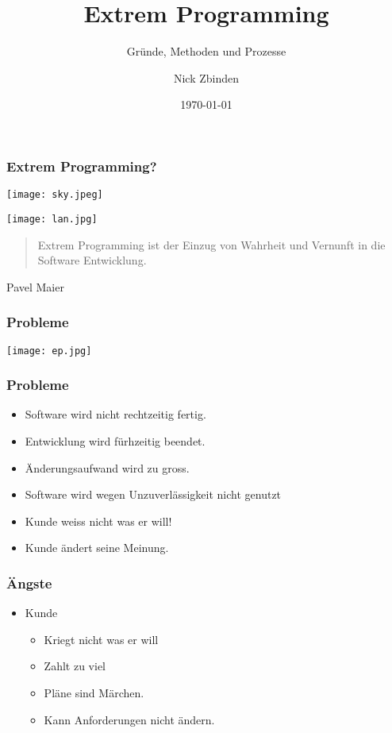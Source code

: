 \documentclass[compress, blue]{beamer}
\title{Extrem Programming}
\subtitle{Gründe, Methoden und Prozesse}
\author{Nick Zbinden}
\date{\today}
\begin{document}
\begin{frame}
  \titlepage
\end{frame}

\begin{frame}\frametitle{Extrem Programming?}
  \texttt{[image: sky.jpeg]}
\end{frame}

\begin{frame}
  \texttt{[image: lan.jpg]}
\end{frame}

\begin{frame}
  \begin{quote}
    Extrem Programming ist der Einzug von Wahrheit und Vernunft in die Software Entwicklung.
  \end{quote}
  Pavel Maier
\end{frame}

\begin{frame}\frametitle{Probleme}
  \texttt{[image: ep.jpg]}  
\end{frame}

\begin{frame}\frametitle{Probleme}
  \begin{itemize}
  \item Software wird nicht rechtzeitig fertig. \pause
  \item Entwicklung wird fürhzeitig beendet. \pause
  \item Änderungsaufwand wird zu gross. \pause
  \item Software wird wegen Unzuverlässigkeit nicht genutzt \pause
  \item Kunde weiss nicht was er will! \pause
  \item Kunde ändert seine Meinung.
  \end{itemize}
\end{frame}

\begin{frame}\frametitle{Ängste}
  \begin{itemize}
  \item Kunde \pause
    \begin{itemize}
    \item Kriegt nicht was er will \pause
    \item Zahlt zu viel \pause
    \item Pläne sind Märchen.  \pause
    \item Kann Anforderungen nicht ändern. 
    \end{itemize}
  \end{itemize}
\end{frame}
\end{document}
